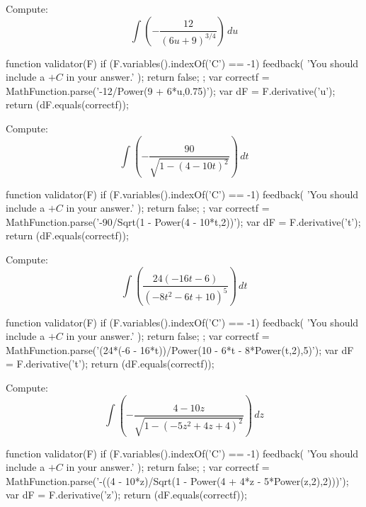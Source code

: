 \documentclass{ximera}
\renewcommand{\d}{\, d}
\begin{document}
\begin{exercise}
Compute: 
\[
\int \left(-\frac{12}{(6 u+9)^{3/4}}\right)\d u
\]
\begin{expressionAnswer}
     function validator(F) {
      if (F.variables().indexOf('C') == -1) {
        feedback( 'You should include a $+C$ in your answer.' );
        return false;
      };      
      var correctf = MathFunction.parse('-12/Power(9 + 6*u,0.75)');
      var dF = F.derivative('u');
      return (dF.equals(correctf));
    }
\end{expressionAnswer}
\end{exercise}



\begin{exercise}
Compute: 
\[
\int \left(-\frac{90}{\sqrt{1-(4-10 t)^2}}\right)\d t
\]
\begin{expressionAnswer}
     function validator(F) {
      if (F.variables().indexOf('C') == -1) {
        feedback( 'You should include a $+C$ in your answer.' );
        return false;
      };      
      var correctf = MathFunction.parse('-90/Sqrt(1 - Power(4 - 10*t,2))');
      var dF = F.derivative('t');
      return (dF.equals(correctf));
    }
\end{expressionAnswer}
\end{exercise}



\begin{exercise}
Compute: 
\[
\int \left(\frac{24 (-16 t-6)}{\left(-8 t^2-6 t+10\right)^5}\right)\d t
\]
\begin{expressionAnswer}
     function validator(F) {
      if (F.variables().indexOf('C') == -1) {
        feedback( 'You should include a $+C$ in your answer.' );
        return false;
      };      
      var correctf = MathFunction.parse('(24*(-6 - 16*t))/Power(10 - 6*t - 8*Power(t,2),5)');
      var dF = F.derivative('t');
      return (dF.equals(correctf));
    }
\end{expressionAnswer}
\end{exercise}



\begin{exercise}
Compute: 
\[
\int \left(-\frac{4-10 z}{\sqrt{1-\left(-5 z^2+4 z+4\right)^2}}\right)\d z
\]
\begin{expressionAnswer}
     function validator(F) {
      if (F.variables().indexOf('C') == -1) {
        feedback( 'You should include a $+C$ in your answer.' );
        return false;
      };      
      var correctf = MathFunction.parse('-((4 - 10*z)/Sqrt(1 - Power(4 + 4*z - 5*Power(z,2),2)))');
      var dF = F.derivative('z');
      return (dF.equals(correctf));
    }
\end{expressionAnswer}
\end{exercise}
\end{document}
